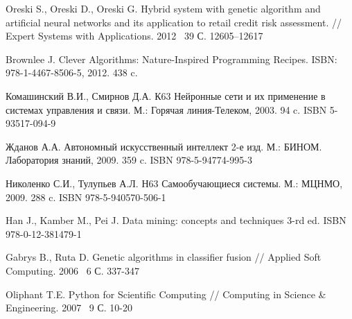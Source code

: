 \documentclass[utf8,usehyperref,14pt]{G7-32}
\begin{document}
\begin{thebibliography}{1} %

{Oreski} S., {Oreski} D., {Oreski} G.
\newblock Hybrid system with genetic algorithm and artificial neural networks and its
application to retail credit risk assessment.
\newblock // Expert Systems with Applications. 2012 \No \ 39 С. 12605–12617

{Brownlee} J.
\newblock Clever Algorithms: Nature-Inspired Programming Recipes.
\newblock ISBN: 978-1-4467-8506-5, 2012. 438 c.

{Комашинский} В.И., {Смирнов} Д.А.
\newblock К63 Нейронные сети и их применение в системах управления и связи.
\newblock М.: Горячая линия-Телеком, 2003. 94 c. ISBN 5-93517-094-9

{Жданов} А.А.
\newblock Автономный искусственный интеллект 2-е изд.
\newblock М.: БИНОМ. Лаборатория знаний, 2009. 359 c. ISBN 978-5-94774-995-3

{Николенко} С.И., {Тулупьев} А.Л.
\newblock Н63 Самообучающиеся системы.
\newblock М.: МЦНМО, 2009. 288 c. ISBN 978-5-940570-506-1

{Han} J., {Kamber} M., {Pei} J.
\newblock Data mining: concepts and techniques 3-rd ed.
\newblock ISBN 978-0-12-381479-1

{Gabrys} B., {Ruta} D.
\newblock Genetic algorithms in classifier fusion
\newblock // Applied Soft Computing. 2006 \No \ 6 С. 337-347

{Oliphant} T.E.
\newblock Python for Scientific Computing
\newblock // Computing in Science \& Engineering. 2007 \No \ 9 С. 10-20

\end{thebibliography}

\newpage
\appendix
\end{document}
